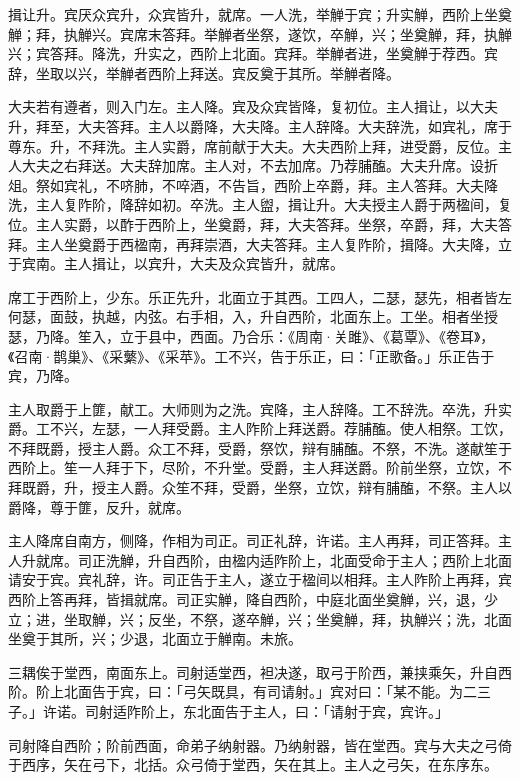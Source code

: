 \documentclass[]{article}
\begin{document}
揖让升。宾厌众宾升，众宾皆升，就席。一人洗，举觯于宾；升实觯，西阶上坐奠觯；拜，执觯兴。宾席末答拜。举觯者坐祭，遂饮，卒觯，兴；坐奠觯，拜，执觯兴；宾答拜。降洗，升实之，西阶上北面。宾拜。举觯者进，坐奠觯于荐西。宾辞，坐取以兴，举觯者西阶上拜送。宾反奠于其所。举觯者降。

大夫若有遵者，则入门左。主人降。宾及众宾皆降，复初位。主人揖让，以大夫升，拜至，大夫答拜。主人以爵降，大夫降。主人辞降。大夫辞洗，如宾礼，席于尊东。升，不拜洗。主人实爵，席前献于大夫。大夫西阶上拜，进受爵，反位。主人大夫之右拜送。大夫辞加席。主人对，不去加席。乃荐脯醢。大夫升席。设折俎。祭如宾礼，不哜肺，不啐酒，不告旨，西阶上卒爵，拜。主人答拜。大夫降洗，主人复阼阶，降辞如初。卒洗。主人盥，揖让升。大夫授主人爵于两楹间，复位。主人实爵，以酢于西阶上，坐奠爵，拜，大夫答拜。坐祭，卒爵，拜，大夫答拜。主人坐奠爵于西楹南，再拜崇酒，大夫答拜。主人复阼阶，揖降。大夫降，立于宾南。主人揖让，以宾升，大夫及众宾皆升，就席。

席工于西阶上，少东。乐正先升，北面立于其西。工四人，二瑟，瑟先，相者皆左何瑟，面鼓，执越，内弦。右手相，入，升自西阶，北面东上。工坐。相者坐授瑟，乃降。笙入，立于县中，西面。乃合乐：《周南·关雎》、《葛覃》、《卷耳》，《召南·鹊巢》、《采蘩》、《采苹》。工不兴，告于乐正，曰：「正歌备。」乐正告于宾，乃降。

主人取爵于上篚，献工。大师则为之洗。宾降，主人辞降。工不辞洗。卒洗，升实爵。工不兴，左瑟，一人拜受爵。主人阼阶上拜送爵。荐脯醢。使人相祭。工饮，不拜既爵，授主人爵。众工不拜，受爵，祭饮，辩有脯醢。不祭，不洗。遂献笙于西阶上。笙一人拜于下，尽阶，不升堂。受爵，主人拜送爵。阶前坐祭，立饮，不拜既爵，升，授主人爵。众笙不拜，受爵，坐祭，立饮，辩有脯醢，不祭。主人以爵降，尊于篚，反升，就席。

主人降席自南方，侧降，作相为司正。司正礼辞，许诺。主人再拜，司正答拜。主人升就席。司正洗觯，升自西阶，由楹内适阼阶上，北面受命于主人；西阶上北面请安于宾。宾礼辞，许。司正告于主人，遂立于楹间以相拜。主人阼阶上再拜，宾西阶上答再拜，皆揖就席。司正实觯，降自西阶，中庭北面坐奠觯，兴，退，少立；进，坐取觯，兴；反坐，不祭，遂卒觯，兴；坐奠觯，拜，执觯兴；洗，北面坐奠于其所，兴；少退，北面立于觯南。未旅。

三耦俟于堂西，南面东上。司射适堂西，袒决遂，取弓于阶西，兼挟乘矢，升自西阶。阶上北面告于宾，曰：「弓矢既具，有司请射。」宾对曰：「某不能。为二三子。」许诺。司射适阼阶上，东北面告于主人，曰：「请射于宾，宾许。」

司射降自西阶；阶前西面，命弟子纳射器。乃纳射器，皆在堂西。宾与大夫之弓倚于西序，矢在弓下，北括。众弓倚于堂西，矢在其上。主人之弓矢，在东序东。
\end{document}
